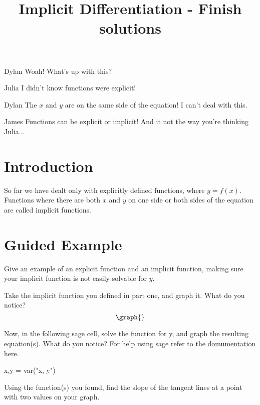\documentclass{ximera}
\title{Implicit Differentiation - Finish solutions}
\begin{document}
\maketitle
\begin{dialogue}
\item[Dylan] Woah! What's up with this?
\item[Julia] I didn't know functions were explicit!
\item[Dylan] The $x$ and $y$ are on the same side of the equation! I can't deal with this.
\item[James] Functions can be explicit or implicit! And it not the way you're thinking Julia...
\end{dialogue}
\section{Introduction}
So far we have dealt only with explicitly defined functions, where $y=f(x)$.  Functions where there are both $x$ and $y$ on one side or both sides of the equation are called implicit functions.
\section{Guided Example}
\begin{question}
Give an example of an explicit function and an implicit function, making sure your implicit function is not easily solvable for $y$.
\begin{freeResponse}
\end{freeResponse}
\end{question}
\begin{question}
Take the implicit function you defined in part one, and graph it. What do you notice?
\[
\graph{}
\]
\begin{freeResponse}
\end{freeResponse}
\end{question}
\begin{question}
Now, in the following sage cell, solve the function for y, and graph the resulting equation(s). What do you notice? For help using sage refer to the \href{http://doc.sagemath.org/html/en/tutorial/tour_algebra.html#solving-equations}{domumentation} here.

\begin{onlineOnly}
\begin{sageCell}
x,y = var("x, y")

\end{sageCell}
\end{onlineOnly}
\begin{freeResponse}
\end{freeResponse}
\end{question}
\begin{question}
Using the function(s) you found, find the slope of the tangent lines at a point with two values on your graph.
\begin{freeResponse}
\end{freeResponse}
\end{question}
\setcounter{problem}{0}
\end{document}
